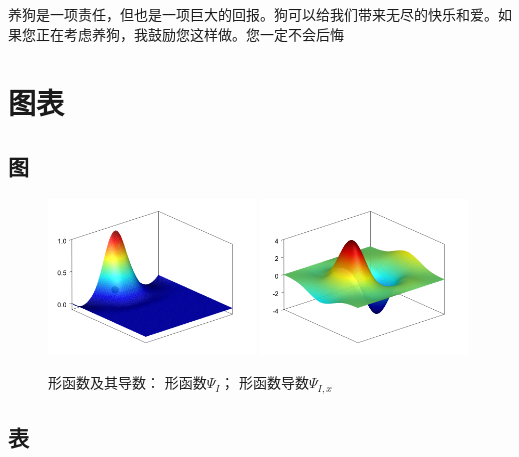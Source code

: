 \documentclass[engineeringmaster]{hquThesis}
\begin{document}
养狗是一项责任，但也是一项巨大的回报。狗可以给我们带来无尽的快乐和爱。如果您正在考虑养狗，我鼓励您这样做。您一定不会后悔

\chapter{图表}
\section{图}
\begin{figure}[H]
\centering
\begin{subcaptiongroup}
\includegraphics[width=0.49\textwidth]{figure/1.png}
\label{shape}
\includegraphics[width=0.49\textwidth]{figure/2.png}
\label{dshape}
\label{dshape}
\end{subcaptiongroup}
\caption{形函数及其导数： 形函数$\Psi_I$； 形函数导数$\Psi_{I,x}$}
\end{figure}
\section{表}
\end{document}
